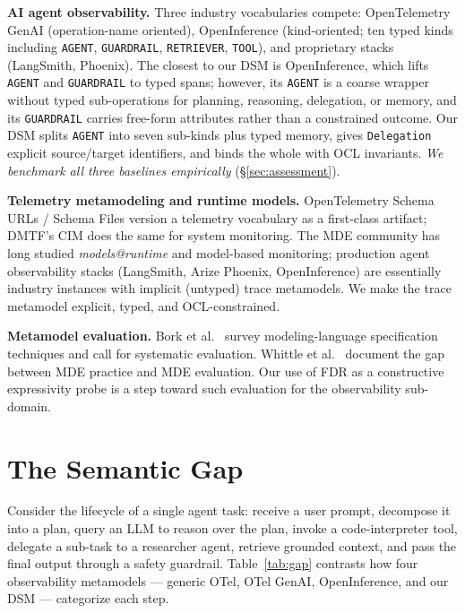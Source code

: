 \documentclass[sigconf,nonacm]{acmart}
\begin{document}
\textbf{AI agent observability.} Three industry vocabularies compete: OpenTelemetry GenAI \cite{opentelemetry-genai} (operation-name oriented), OpenInference \cite{openinference2024} (kind-oriented; ten typed kinds including \texttt{AGENT}, \texttt{GUARDRAIL}, \texttt{RETRIEVER}, \texttt{TOOL}), and proprietary stacks (LangSmith, Phoenix). The closest to our DSM is OpenInference, which lifts \texttt{AGENT} and \texttt{GUARDRAIL} to typed spans; however, its \texttt{AGENT} is a coarse wrapper without typed sub-operations for planning, reasoning, delegation, or memory, and its \texttt{GUARDRAIL} carries free-form attributes rather than a constrained outcome. Our DSM splits \texttt{AGENT} into seven sub-kinds plus typed memory, gives \texttt{Delegation} explicit source/target identifiers, and binds the whole with OCL invariants. \emph{We benchmark all three baselines empirically} (\S\ref{sec:assessment}).

\textbf{Telemetry metamodeling and runtime models.} OpenTelemetry Schema URLs / Schema Files version a telemetry vocabulary as a first-class artifact; DMTF's CIM \cite{dmtf-cim} does the same for system monitoring. The MDE community has long studied \emph{models@runtime} \cite{blair2009runtime} and model-based monitoring; production agent observability stacks (LangSmith, Arize Phoenix, OpenInference) are essentially industry instances with implicit (untyped) trace metamodels. We make the trace metamodel explicit, typed, and OCL-constrained.

\textbf{Metamodel evaluation.} Bork et al.\ \cite{bork2020specification} survey modeling-language specification techniques and call for systematic evaluation. Whittle et al.\ \cite{whittle2014state} document the gap between MDE practice and MDE evaluation. Our use of FDR as a constructive expressivity probe is a step toward such evaluation for the observability sub-domain.

\section{The Semantic Gap}
\label{sec:gap}

Consider the lifecycle of a single agent task: receive a user prompt, decompose it into a plan, query an LLM to reason over the plan, invoke a code-interpreter tool, delegate a sub-task to a researcher agent, retrieve grounded context, and pass the final output through a safety guardrail. Table~\ref{tab:gap} contrasts how four observability metamodels --- generic OTel, OTel GenAI, OpenInference, and our DSM --- categorize each step.
\end{document}
